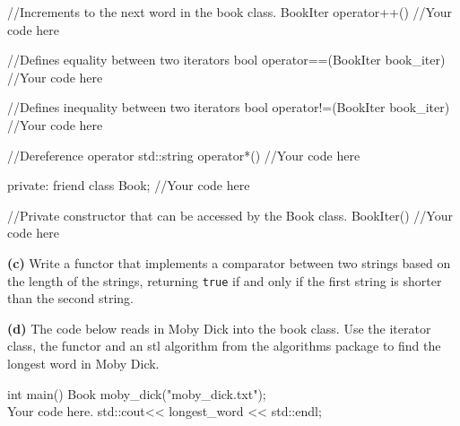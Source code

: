 \documentclass[12pt,letterpaper,twoside]{article}
\begin{document}
\begin{cpp}
{	
	//Increments to the next word in the book class.
	BookIter operator++()
	{
		//Your code here
	}
	
	//Defines equality between two iterators
	bool operator==(BookIter book_iter)
	{
		//Your code here		
	}
	
	//Defines inequality between two iterators
	bool operator!=(BookIter book_iter)
	{
		//Your code here		
	}
	
	//Dereference operator
	std::string operator*()
	{
		//Your code here			
	}
	
	
	private:
	friend class Book;
	//Your code here
	
	//Private constructor that can be accessed by the Book class.
	BookIter(){
		//Your code here
	}
}

\end{cpp}

\begin{solution}

\end{solution}
 
\textbf{(c)} Write a functor that implements a comparator between two strings based on the length of the strings, returning \texttt{true} if and only if the first string is shorter than the second string.

\begin{solution}

\end{solution}

\textbf{(d)} The code below reads in Moby Dick into the book class. Use the iterator class, the functor and an stl algorithm from the algorithms package to find the longest word in Moby Dick.

\begin{cpp}
int main()
{
	Book moby_dick("moby_dick.txt");
	\\ Your code here.
	std::cout<< longest_word << std::endl;
}
\end{cpp}

\begin{solution}

\end{solution}
\end{document}
